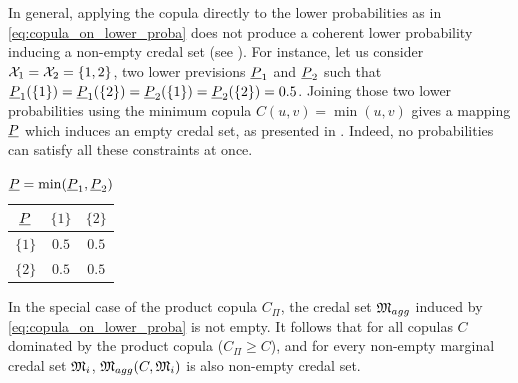 In general, applying the copula directly to the lower probabilities as in \eqref{eq:copula_on_lower_proba} does not produce a coherent lower probability inducing a non-empty credal set (see ). For instance, let us consider $\mathcal{X}_1 = \mathcal{X}_2 = \{1, 2\}$, two lower previsions $\underline{P}_1$ and $\underline{P}_2$ such that $\underline{P}_1(\{1\}) = \underline{P}_1(\{2\}) = \underline{P}_2(\{1\}) = \underline{P}_2(\{2\}) = 0.5$. Joining those two lower probabilities using the minimum copula $C(u,v)=\min(u,v)$ gives a mapping $\underline{P}$ which induces an empty credal set, as presented in . Indeed, no probabilities can satisfy all these constraints at once. 

\begin{table}[!ht]
    \centering
    \begin{tabular}{|c||c|c|}
        \hline
        \hspace{0.2cm} $\underline{P}$ \hspace{0.2cm} & \hspace{0.2cm} $\{1\}$ \hspace{0.2cm} & \hspace{0.2cm} $\{2\}$ \hspace{0.2cm} \\\hline\hline
        $\{1\}$ & $0.5$ & $0.5$ \\\hline
        $\{2\}$ & $0.5$ & $0.5$\\
        \hline
        \end{tabular}
        \caption{$\underline{P} = \min(\underline{P}_1, \underline{P}_2)$}
        \label{tab:non_coherent_lower}
\end{table}

\begin{proposition}
    In the special case of the product copula $C_\Pi$, the credal set $\mathfrak{M}_{agg}$ induced by \eqref{eq:copula_on_lower_proba} is not empty. It follows that for all copulas $C$ dominated by the product copula (\ie $C_\Pi\geqslant C$), and for every non-empty marginal credal set $\mathfrak{M}_i$, $\mathfrak{M}_{agg}(C, \mathfrak{M}_i)$ is also non-empty credal set.
\end{proposition}

